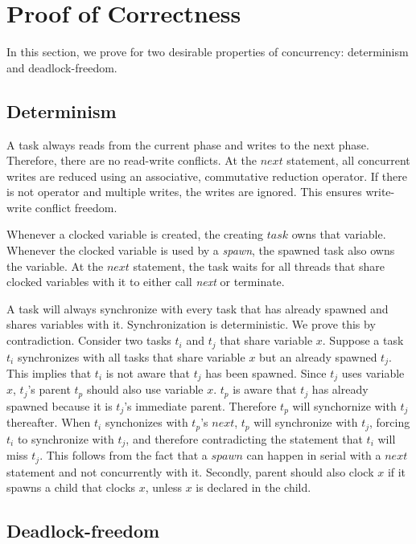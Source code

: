\documentclass[10pt, conference, compsocconf]{IEEEtran}
\begin{document}
\section{Proof of Correctness}
\label{sec:proof}
In this section, we prove for two desirable properties of concurrency: determinism
and deadlock-freedom.

\subsection{Determinism}
A task always reads from the current phase and writes to the next phase.
Therefore, there are no read-write conflicts.
At the $next$ statement, all concurrent writes are reduced using an associative, commutative
reduction operator. If there is not operator and multiple writes,
the writes are ignored. This ensures write-write conflict freedom.

Whenever a clocked variable is created, the creating $task$ owns that
variable. Whenever the clocked variable is used by a \emph{spawn}, the spawned
task also owns the variable. At the $next$ statement, the task waits for all 
threads that share clocked variables with it to either call \emph{next} or terminate.

A task will always synchronize with every task that has already spawned and shares variables with it. Synchronization is deterministic.
We prove this by contradiction. Consider two tasks $t_i$ and $t_j$
that share variable $x$. Suppose a task $t_i$ synchronizes with 
all tasks that share variable $x$  but an already spawned $t_j$.
This implies that $t_i$ is not aware that $t_j$ has been spawned.
Since $t_j$ uses variable $x$, $t_j$'s parent $t_p$ should
also use variable $x$.  $t_p$ is aware that $t_j$ has already spawned because
it is $t_j$'s immediate parent. Therefore $t_p$ will synchornize with $t_j$ thereafter. 
When $t_i$ synchonizes with $t_p$'s $next$, $t_p$ will synchronize with $t_j$, 
forcing $t_i$ to synchronize with $t_j$, and therefore  contradicting the statement that $t_i$ will
miss $t_j$. This follows from the fact that a $spawn$ can happen in serial with a $next$ statement
and not concurrently with it.  Secondly, parent should also clock  $x$ if it spawns a child 
that clocks $x$, unless $x$ is declared in the child.


\subsection{Deadlock-freedom}
\end{document}
